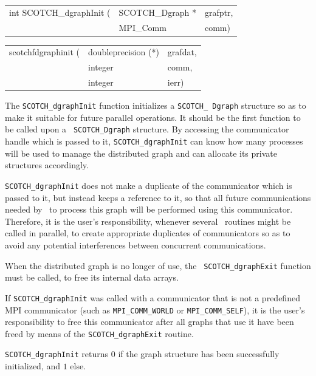 \begin{itemize}
\progsyn

{\tt\begin{tabular}{l@{}ll}
int SCOTCH\_dgraphInit ( & SCOTCH\_Dgraph * & grafptr, \\
                         & MPI\_Comm        & comm)
\end{tabular}}

{\tt\begin{tabular}{l@{}ll}
scotchfdgraphinit ( & doubleprecision (*) & grafdat, \\
                    & integer             & comm, \\
                    & integer             & ierr)
\end{tabular}}

\progdes

The {\tt SCOTCH\_dgraphInit} function initializes a {\tt SCOTCH\_\lbt
Dgraph} structure so as to make it suitable for future parallel
operations. It should be the first function to be called upon a {\tt
SCOTCH\_\lbt Dgraph} structure. By accessing the communicator handle
which is passed to it, {\tt SCOTCH\_dgraphInit} can know how many
processes will be used to manage the distributed graph and can allocate
its private structures accordingly.

{\tt SCOTCH\_dgraphInit} does not make a duplicate of the communicator
which is passed to it, but instead keeps a reference to it, so that
all future communications needed by \libscotch\ to process this graph
will be performed using this communicator. Therefore, it is the user's
responsibility, whenever several \libscotch\ routines might be called
in parallel, to create appropriate duplicates of communicators so as
to avoid any potential interferences between concurrent
communications.

When the distributed graph is no longer of use, the {\tt
SCOTCH\_\lbt dgraph\lbt Exit} function must be called, to free
its internal data arrays.

If {\tt SCOTCH\_\lbt dgraph\lbt Init} was called with a
communicator that is not a predefined MPI communicator (such as
{\tt MPI\_\tt COMM\_\lbt WORLD} or {\tt MPI\_\tt COMM\_\lbt SELF}), it
is the user's responsibility to free this communicator after
all graphs that use it have been freed by means of the
{\tt SCOTCH\_\lbt dgraph\lbt Exit} routine.

\progret

{\tt SCOTCH\_dgraphInit} returns $0$ if the graph structure has been
successfully initialized, and $1$ else.
\end{itemize}

